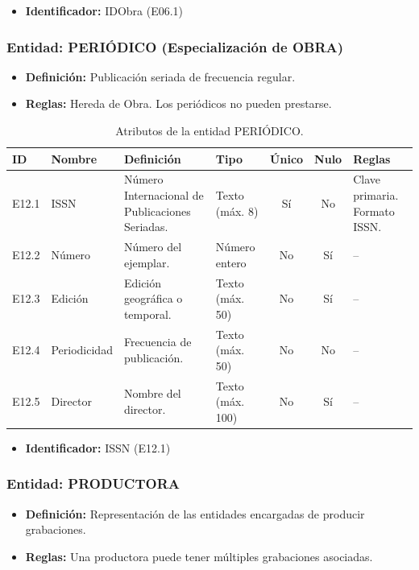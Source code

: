 \begin{itemize}
	\item\textbf{Identificador:} IDObra (E06.1)
\end{itemize}

\subsubsection{Entidad: PERIÓDICO (Especialización de OBRA)}
\begin{itemize}
	\item\textbf{Definición:} Publicación seriada de frecuencia regular.
	\item\textbf{Reglas:} Hereda de Obra. Los periódicos no pueden prestarse.
\end{itemize}

\begin{table}[H]
	\centering
	\caption{Atributos de la entidad PERIÓDICO.}
	\label{tab:dict_periodico}
	\small
	\begin{tabularx}{\textwidth}{l l X l c c X}
		\toprule
		\textbf{ID} & \textbf{Nombre} & \textbf{Definición} & \textbf{Tipo} & \textbf{Único} & \textbf{Nulo} & \textbf{Reglas} \\
		\midrule
		E12.1 & ISSN & Número Internacional de Publicaciones Seriadas. & Texto (máx. 8) & Sí & No & Clave primaria. Formato ISSN. \\
		\addlinespace
		E12.2 & Número & Número del ejemplar. & Número entero & No & Sí & -- \\
		\addlinespace
		E12.3 & Edición & Edición geográfica o temporal. & Texto (máx. 50) & No & Sí & -- \\
		\addlinespace
		E12.4 & Periodicidad & Frecuencia de publicación. & Texto (máx. 50) & No & No & -- \\
		\addlinespace
		E12.5 & Director & Nombre del director. & Texto (máx. 100) & No & Sí & -- \\
		\bottomrule
	\end{tabularx}
\end{table}

\begin{itemize}
	\item\textbf{Identificador:} ISSN (E12.1)
\end{itemize}

\subsubsection{Entidad: PRODUCTORA}
\begin{itemize}
	\item\textbf{Definición:} Representación de las entidades encargadas de producir grabaciones.
	\item\textbf{Reglas:} Una productora puede tener múltiples grabaciones asociadas.
\end{itemize}

